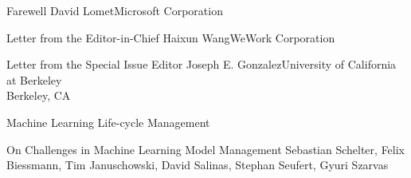 \documentclass[11pt]{article}
\begin{document}


\begin{bulletin}

%
%

\begin{lettersection}


\begin{letter}{Farewell}
{David Lomet}{Microsoft Corporation}

\end{letter}
\newpage
\begin{letter}{Letter from the Editor-in-Chief}
{Haixun Wang}{WeWork Corporation}

\end{letter}
%
\newpage
%
%

\begin{letter}{Letter from the Special Issue Editor}
{Joseph E. Gonzalez}{University of California at Berkeley\\ Berkeley, CA}
\graphicspath{{letters/}}

\end{letter}

\end{lettersection}



\begin{articlesection}{Machine Learning Life-cycle Management}
%
%
%
\begin{article}
{On Challenges in Machine Learning Model Management}
{Sebastian Schelter, Felix Biessmann, Tim Januschowski, David Salinas, Stephan Seufert, Gyuri Szarvas}
\graphicspath{{submissions/AmazonModelManagement/figs/}}

\end{article}



\end{articlesection}
\end{bulletin}
\end{document}
